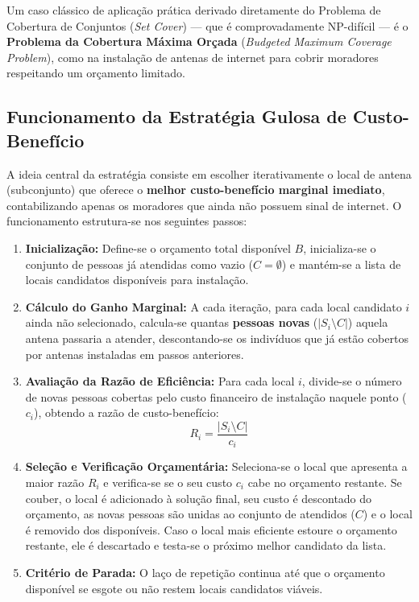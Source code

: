 Um caso clássico de aplicação prática derivado diretamente do Problema de Cobertura de Conjuntos (\textit{Set Cover}) --- que é comprovadamente NP-difícil --- é o \textbf{Problema da Cobertura Máxima Orçada} (\textit{Budgeted Maximum Coverage Problem}), como na instalação de antenas de internet para cobrir moradores respeitando um orçamento limitado.

\subsection{Funcionamento da Estratégia Gulosa de Custo-Benefício}

A ideia central da estratégia consiste em escolher iterativamente o local de antena (subconjunto) que oferece o \textbf{melhor custo-benefício marginal imediato}, contabilizando apenas os moradores que ainda não possuem sinal de internet. O funcionamento estrutura-se nos seguintes passos:

\begin{enumerate}
    \item \textbf{Inicialização:} Define-se o orçamento total disponível $B$, inicializa-se o conjunto de pessoas já atendidas como vazio ($C = \emptyset$) e mantém-se a lista de locais candidatos disponíveis para instalação.
    \item \textbf{Cálculo do Ganho Marginal:} A cada iteração, para cada local candidato $i$ ainda não selecionado, calcula-se quantas \textbf{pessoas novas} ($|S_i \setminus C|$) aquela antena passaria a atender, descontando-se os indivíduos que já estão cobertos por antenas instaladas em passos anteriores.
    \item \textbf{Avaliação da Razão de Eficiência:} Para cada local $i$, divide-se o número de novas pessoas cobertas pelo custo financeiro de instalação naquele ponto ($c_i$), obtendo a razão de custo-benefício:
    \begin{equation}
        R_i = \frac{|S_i \setminus C|}{c_i}
    \end{equation}
    \item \textbf{Seleção e Verificação Orçamentária:} Seleciona-se o local que apresenta a maior razão $R_i$ e verifica-se se o seu custo $c_i$ cabe no orçamento restante. Se couber, o local é adicionado à solução final, seu custo é descontado do orçamento, as novas pessoas são unidas ao conjunto de atendidos ($C$) e o local é removido dos disponíveis. Caso o local mais eficiente estoure o orçamento restante, ele é descartado e testa-se o próximo melhor candidato da lista.
    \item \textbf{Critério de Parada:} O laço de repetição continua até que o orçamento disponível se esgote ou não restem locais candidatos viáveis.
\end{enumerate}

